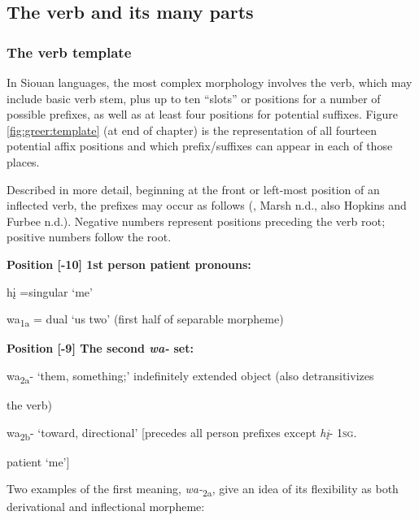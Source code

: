 \documentclass[output=paper]{LSP/langsci}
\begin{document}
\subsection{The verb and its many parts}
	
\subsubsection{The verb template}  									                      
In Siouan languages, the most complex morphology involves the verb, which may include basic verb stem, plus up to ten ``slots'' or positions for a number of possible prefixes, as well as at least four positions for potential suffixes.  Figure \ref{fig:greer:template} (at end of chapter) is the representation of all fourteen potential affix positions and which prefix/suffixes can appear in each of those places. 

Described in more detail, beginning at the front or left-most position of an inflected verb, the prefixes may occur as follows (\citealt[246]{Whitman1947}, Marsh n.d., also Hopkins and Furbee n.d.). Negative numbers represent positions preceding the verb root; positive numbers follow the root.

\vspace{1em}
\textbf{Position [-10] 	1st person patient pronouns:} 	

\hspace{2em} h\k{i} =singular `me' 
												
\hspace{2em} wa\textsubscript{1a} = dual  `us two'	 (first half of separable morpheme)					           

\vspace{1em}
\textbf{Position [-9] 	The second \textit{wa-}  set:} 	
										
\hspace{2em} wa\textsubscript{2a}- `them, something;' indefinitely extended object (also detransitivizes 

\hspace{3em} the verb)		
	
\hspace{2em} wa\textsubscript{2b}- `toward, directional' 	[precedes all person prefixes except \textit{h\k{i}}- 1\textsc{sg}.

\hspace{3em} patient `me'] 	 				      

\vspace{1em}
Two examples of the first meaning, \textit{wa-}\textsubscript{2a}, give an idea of its flexibility as both derivational and inflectional morpheme:    	
\end{document}
